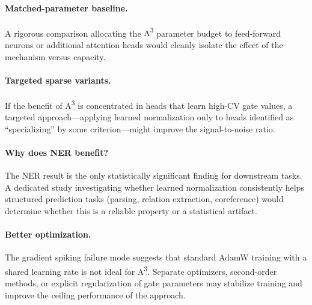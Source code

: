 \documentclass[11pt]{article}
\newcommand{\AAA}{\textsc{A\textsuperscript{3}}}
\begin{document}
\paragraph{Matched-parameter baseline.} A rigorous comparison allocating the \AAA{} parameter budget to feed-forward neurons or additional attention heads would cleanly isolate the effect of the mechanism versus capacity.

\paragraph{Targeted sparse variants.} If the benefit of \AAA{} is concentrated in heads that learn high-CV gate values, a targeted approach---applying learned normalization only to heads identified as ``specializing'' by some criterion---might improve the signal-to-noise ratio.

\paragraph{Why does NER benefit?} The NER result is the only statistically significant finding for downstream tasks. A dedicated study investigating whether learned normalization consistently helps structured prediction tasks (parsing, relation extraction, coreference) would determine whether this is a reliable property or a statistical artifact.

\paragraph{Better optimization.} The gradient spiking failure mode suggests that standard AdamW training with a shared learning rate is not ideal for \AAA{}. Separate optimizers, second-order methods, or explicit regularization of gate parameters may stabilize training and improve the ceiling performance of the approach.
\end{document}
